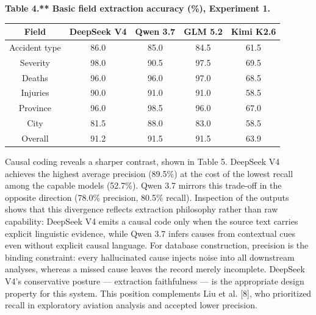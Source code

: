 \documentclass[11pt]{article}
\begin{document}
\textbf{Table 4.** Basic field extraction accuracy (\%), Experiment 1.}
\begin{table}[htbp]
\centering
\small
\begin{tabular}{ccccc}
\hline
Field & DeepSeek V4 & Qwen 3.7 & GLM 5.2 & Kimi K2.6 \\
\hline
Accident type & 86.0 & 85.0 & 84.5 & 61.5 \\
Severity & 98.0 & 90.5 & 97.5 & 69.5 \\
Deaths & 96.0 & 96.0 & 97.0 & 68.5 \\
Injuries & 90.0 & 91.0 & 91.0 & 58.5 \\
Province & 96.0 & 98.5 & 96.0 & 67.0 \\
City & 81.5 & 88.0 & 83.0 & 58.5 \\
Overall & 91.2 & 91.5 & 91.5 & 63.9 \\
\hline
\end{tabular}
\end{table}
Causal coding reveals a sharper contrast, shown in Table 5. DeepSeek V4 achieves the highest average precision (89.5\%) at the cost of the lowest recall among the capable models (52.7\%). Qwen 3.7 mirrors this trade-off in the opposite direction (78.0\% precision, 80.5\% recall). Inspection of the outputs shows that this divergence reflects extraction philosophy rather than raw capability: DeepSeek V4 emits a causal code only when the source text carries explicit linguistic evidence, while Qwen 3.7 infers causes from contextual cues even without explicit causal language. For database construction, precision is the binding constraint: every hallucinated cause injects noise into all downstream analyses, whereas a missed cause leaves the record merely incomplete. DeepSeek V4's conservative posture --- extraction faithfulness --- is the appropriate design property for this system. This position complements Liu et al. [8], who prioritized recall in exploratory aviation analysis and accepted lower precision.
\end{document}
